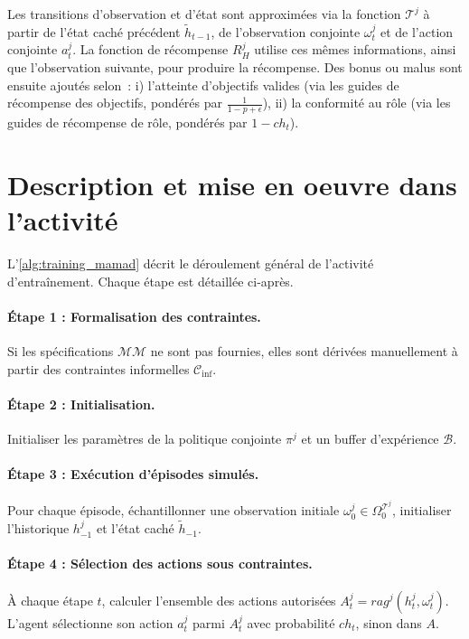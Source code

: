 Les transitions d'observation et d'état sont approximées via la fonction $\mathcal{T}^j$ à partir de l'état caché précédent $\tilde{h}_{t-1}$, de l'observation conjointe $\omega^j_t$ et de l'action conjointe $a^j_t$. La fonction de récompense $R^j_H$ utilise ces mêmes informations, ainsi que l'observation suivante, pour produire la récompense. Des bonus ou malus sont ensuite ajoutés selon~:
i) l'atteinte d'objectifs valides (via les guides de récompense des objectifs, pondérés par $\frac{1}{1 - p + \epsilon}$),
ii) la conformité au rôle (via les guides de récompense de rôle, pondérés par $1 - ch_t$).


\section{Description et mise en oeuvre dans l'activité}

L'\autoref{alg:training_mamad} décrit le déroulement général de l'activité d'entraînement.
Chaque étape est détaillée ci-après.

\paragraph{Étape 1 : Formalisation des contraintes.}
Si les spécifications $\mathcal{MM}$ ne sont pas fournies, elles sont dérivées manuellement à partir des contraintes informelles $\mathcal{C}_{\text{inf}}$.

\paragraph{Étape 2 : Initialisation.}
Initialiser les paramètres de la politique conjointe $\pi^j$ et un buffer d'expérience $\mathcal{B}$.

\paragraph{Étape 3 : Exécution d'épisodes simulés.}
Pour chaque épisode, échantillonner une observation initiale $\omega_0^j \in \Omega^{\mathcal{T}^j}_0$, initialiser l'historique $h_{-1}^j$ et l'état caché $\tilde{h}_{-1}$.

\paragraph{Étape 4 : Sélection des actions sous contraintes.}
À chaque étape $t$, calculer l'ensemble des actions autorisées $A_t^j = rag^j(h^j_t,\omega_t^j)$.
L'agent sélectionne son action $a_t^j$ parmi $A_t^j$ avec probabilité $ch_t$, sinon dans $A$.


